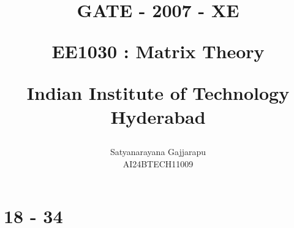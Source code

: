 \documentclass[journal]{IEEEtran}
\begin{document}

\vspace{3cm}




\title{
GATE - 2007 - XE

\large{EE1030 : Matrix Theory}

Indian Institute of Technology Hyderabad
}
\author{Satyanarayana Gajjarapu

AI24BTECH11009
}	





\maketitle




\bigskip

\renewcommand{\thefigure}{\theenumi}
\renewcommand{\thetable}{\theenumi}


\section{18 - 34}
\end{document}
